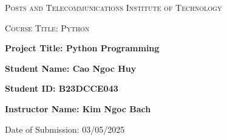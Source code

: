 \documentclass[a4paper,12pt]{article}
\begin{document}
\begin{titlepage}
    \centering

    {\scshape\LARGE Posts and Telecommunications Institute of Technology \par}
    \vspace{2cm}
    
    {\scshape\Large Course Title: Python \par}
    \vspace{1.5cm}
    
    {\huge\bfseries Project Title: Python Programming\par}
    \vspace{2cm}
    
    {\Large\bfseries Student Name: Cao Ngoc Huy\par}
    \vspace{0.5cm}
    {\Large\bfseries Student ID: B23DCCE043\par}
    \vspace{0.5cm}
    
    {\Large\bfseries Instructor Name: Kim Ngoc Bach\par}
    \vfill
    
    {\Large Date of Submission: 03/05/2025\par}
\end{titlepage}
\newpage
\end{document}

